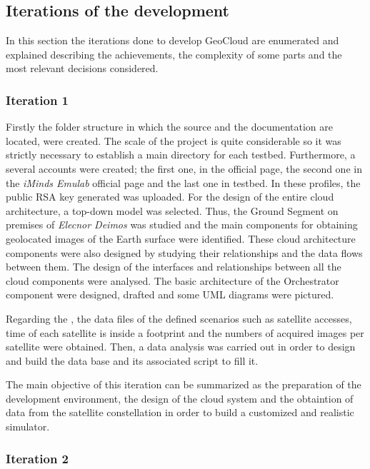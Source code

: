 \subsection{Iterations of the development}

In this section the iterations done to develop GeoCloud are
enumerated and explained describing the achievements, the complexity of some
parts and the most relevant decisions considered.

\subsubsection{Iteration 1}

Firstly the folder structure in which the source and the documentation are
located, were created. The scale of the project is quite considerable so it was
strictly necessary to establish a main directory for each testbed. Furthermore,
a several accounts were created; the first one, in the \bonfire official page,
the second one in the \emph{iMinds Emulab} official page and the last one in \pl
testbed. In these profiles, the
public \ac{RSA} key generated was uploaded.
For the design of the entire cloud architecture, a top-down model was
selected. Thus, the Ground Segment on premises of \emph{Elecnor Deimos} was
studied and the main components for obtaining geolocated images of the Earth
surface were identified. These cloud architecture components were also designed by
studying their relationships and the data flows between them. The design of the
interfaces and relationships between all the cloud components were analysed. 
The basic architecture of the Orchestrator component were
designed, drafted and some \ac{UML} diagrams were pictured. 

Regarding the \sss, the data files of the defined scenarios such as satellite accesses,
time of each satellite is inside a footprint and the numbers of acquired images per
satellite were obtained. Then, a data analysis was carried out in order
to design and build the data base and its associated script to fill it.


The main objective of this iteration can be summarized as the preparation
of the development environment, the design of the cloud system and the
obtaintion of data from the satellite constellation in order to build a
customized and realistic simulator.

\subsubsection{Iteration 2}


